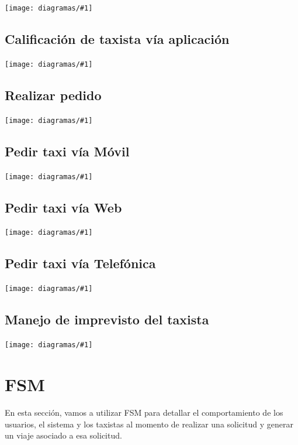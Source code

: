 \documentclass[a4paper, 10pt, twoside]{article}
\newcommand{\diagramav}[1]{%
  \texttt{[image: diagramas/\#1]}%
}
\begin{document}
\diagramav{da-logueo-de-usuario}


\subsection{Calificación de taxista vía aplicación}
\label{sec:calificacion-aplicacion}

\diagramav{da-calificar-taxista}

\subsection{Realizar pedido}
\label{sec:da-pedido-alto-nivel}

\diagramav{da-pedido-alto-nivel}


\subsection{Pedir taxi vía M\'ovil}
\label{sec:pedido-aplicacion-movil}

\diagramav{da-realizar-pedido-aplicacion-movil}

\subsection{Pedir taxi vía Web}
\label{sec:pedido-aplicacion-web}

\diagramav{da-realizar-pedido-aplicacion-web}

\subsection{Pedir taxi vía Telefónica}
\label{sec:pedido-aplicacion-telefonica}

\diagramav{da-realizar-pedido-aplicacion-telefonica}

\subsection{Manejo de imprevisto del taxista}
\label{sec:¡mprevisto-taxista}

\diagramav{da-imprevisto}


\section{FSM}

En esta sección, vamos a utilizar FSM para detallar el comportamiento de los usuarios, el sistema y los taxistas al momento de realizar una solicitud y generar un viaje asociado a esa solicitud.
\end{document}
